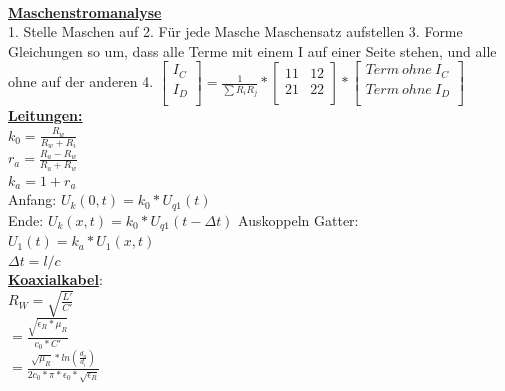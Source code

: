 \documentclass[11pt]{article}
\begin{document}
\begin{landscape}
\begin{minipage}{0.45\textwidth}
\end{minipage}%
~~~~~~~
\begin{minipage}{0.3\textwidth}

\underline{\textbf{Maschenstromanalyse}}\\
1. Stelle Maschen auf
2. Für jede Masche Maschensatz aufstellen
3. Forme Gleichungen so um, dass alle Terme mit einem I auf einer Seite stehen, und alle ohne auf der anderen
4. $\begin{bmatrix}
	I_C\\
	I_D\\
\end{bmatrix} = \frac{1}{\sum R_iR_j} * \begin{bmatrix}
	11 & 12\\ %
	21 & 22\\
\end{bmatrix} * \begin{bmatrix}
	Term~ohne~I_C\\
	Term~ohne~I_D\\
\end{bmatrix} 
 $\\

\underline{\textbf{Leitungen:}}\\
$k_0 = \frac{R_w}{R_w + R_i} $\\
$r_a = \frac{R_a - R_w}{R_a + R_w} $\\
$k_a = 1 + r_a$\\
Anfang: $U_k(0,t)=k_0*U_{q1}(t)$\\
Ende: $U_k(x,t)= k_0*U_{q1}(t-\Delta t)$
Auskoppeln Gatter:\\
\phantom{ss} $U_1(t) = k_a * U_1(x,t)$\\
$\Delta t = l/c$\\

\underline{\textbf{Koaxialkabel}}:\\
$R_W = \sqrt{\frac{L'}{C'}}$\\
    \phantom{sssi} $=\frac{\sqrt{\epsilon_R * \mu_R}}{c_0 * C'}$\\
    \phantom{sssi} $=\frac{\sqrt{\mu_R} * ln(\frac{d_a}{d_i})}{2c_0 * \pi * \epsilon_0 *\sqrt{\epsilon_R}}$\\



\end{minipage}
\end{landscape}
\end{document}
